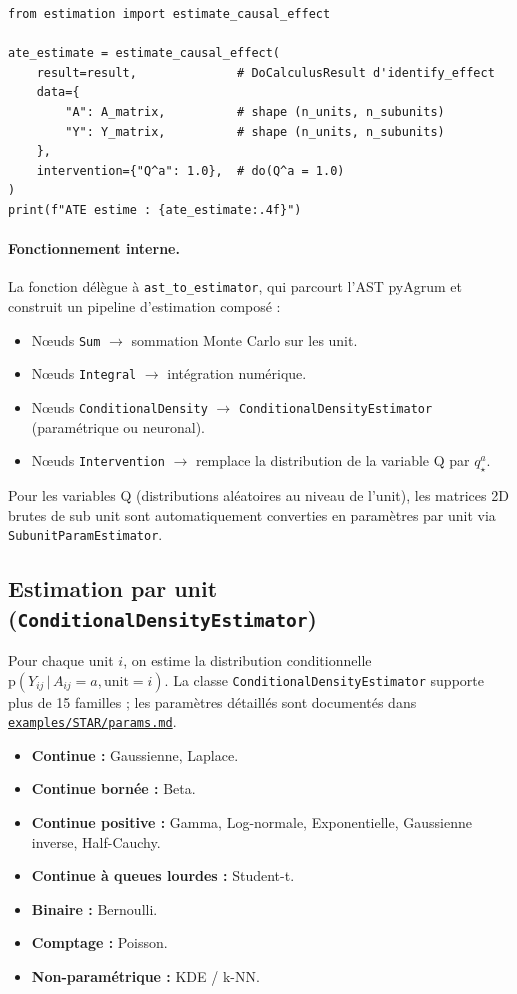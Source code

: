 \documentclass[11pt,a4paper]{article}
\newcommand{\g}{\,\vert\,}
\newcommand{\pr}{\mathrm{p}}
\begin{document}
\begin{lstlisting}[caption={Estimation numérique via \texttt{estimate\_causal\_effect}}]
from estimation import estimate_causal_effect

ate_estimate = estimate_causal_effect(
    result=result,              # DoCalculusResult d'identify_effect
    data={
        "A": A_matrix,          # shape (n_units, n_subunits)
        "Y": Y_matrix,          # shape (n_units, n_subunits)
    },
    intervention={"Q^a": 1.0},  # do(Q^a = 1.0)
)
print(f"ATE estime : {ate_estimate:.4f}")
\end{lstlisting}

\paragraph{Fonctionnement interne.}
La fonction délègue à \texttt{ast\_to\_estimator}, qui parcourt l'AST pyAgrum et construit un pipeline d'estimation composé :
\begin{itemize}
  \item Nœuds \texttt{Sum} $\to$ sommation Monte Carlo sur les unit.
  \item Nœuds \texttt{Integral} $\to$ intégration numérique.
  \item Nœuds \texttt{ConditionalDensity} $\to$ \texttt{ConditionalDensityEstimator} (paramétrique ou neuronal).
  \item Nœuds \texttt{Intervention} $\to$ remplace la distribution de la variable Q par $q^a_\star$.
\end{itemize}
Pour les variables Q (distributions aléatoires au niveau de l'unit), les matrices 2D brutes de sub unit sont automatiquement converties en paramètres par unit via \texttt{SubunitParamEstimator}.

\subsection{Estimation par unit (\texttt{ConditionalDensityEstimator})}

Pour chaque unit $i$, on estime la distribution conditionnelle $\pr(Y_{ij} \g A_{ij} = a, \text{unit}=i)$.
La classe \texttt{ConditionalDensityEstimator} supporte plus de 15 familles ; les paramètres détaillés sont documentés dans \href{https://github.com/janisaiad/hierarchicalcausalmodels/blob/main/examples/STAR/params.md}{\texttt{examples/STAR/params.md}}.

\begin{itemize}
  \item \textbf{Continue :} Gaussienne, Laplace.
  \item \textbf{Continue bornée :} Beta.
  \item \textbf{Continue positive :} Gamma, Log-normale, Exponentielle, Gaussienne inverse, Half-Cauchy.
  \item \textbf{Continue à queues lourdes :} Student-t.
  \item \textbf{Binaire :} Bernoulli.
  \item \textbf{Comptage :} Poisson.
  \item \textbf{Non-paramétrique :} KDE / k-NN.
\end{itemize}
\end{document}
